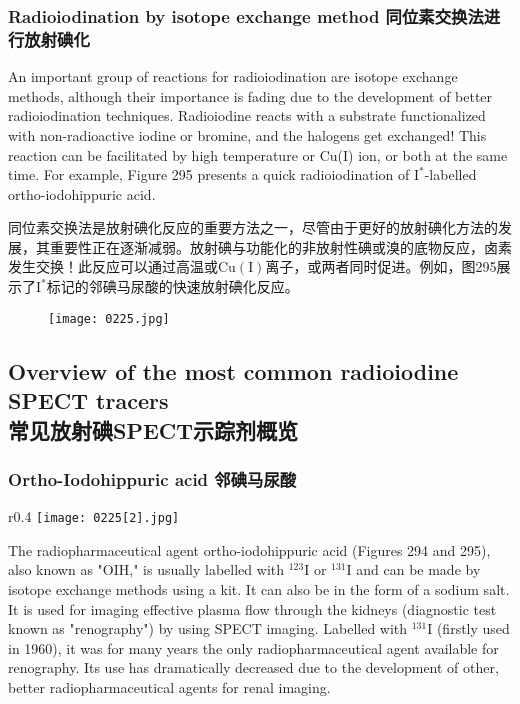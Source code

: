 \documentclass[dvipsnames, svgnames,a4paper,11pt]{article}
\begin{document}
\subsubsection{Radioiodination by isotope exchange method 同位素交换法进行放射碘化}  
An important group of reactions for radioiodination are isotope exchange methods, although their importance is fading due to the development of better radioiodination techniques. Radioiodine reacts with a substrate functionalized with non-radioactive iodine or bromine, and the halogens get exchanged! This reaction can be facilitated by high temperature or Cu(I) ion, or both at the same time. For example, Figure 295 presents a quick radioiodination of \(\mathrm{I}^*\)-labelled ortho-iodohippuric acid.  

同位素交换法是放射碘化反应的重要方法之一，尽管由于更好的放射碘化方法的发展，其重要性正在逐渐减弱。放射碘与功能化的非放射性碘或溴的底物反应，卤素发生交换！此反应可以通过高温或\(\mathrm{Cu(I)}\)离子，或两者同时促进。例如，图295展示了\(\mathrm{I}^*\)标记的邻碘马尿酸的快速放射碘化反应。  

\begin{figure}[h]
	\centering
    \texttt{[image: 0225.jpg]}  
     \label{fig294}
\end{figure}

\subsection{Overview of the most common radioiodine SPECT tracers\\ 常见放射碘SPECT示踪剂概览}  
\subsubsection{Ortho-Iodohippuric acid 邻碘马尿酸}  


\begin{wrapfigure}{r}{0.4\textwidth}
    \centering
    \texttt{[image: 0225[2].jpg]}
     \label{fig295}
\end{wrapfigure}

The radiopharmaceutical agent ortho-iodohippuric acid (Figures 294 and 295), also known as "OIH," is usually labelled with \(\mathrm{^{123}I}\) or \(\mathrm{^{131}I}\) and can be made by isotope exchange methods using a kit. It can also be in the form of a sodium salt. It is used for imaging effective plasma flow through the kidneys (diagnostic test known as "renography") by using SPECT imaging. Labelled with \(\mathrm{^{131}I}\) (firstly used in 1960), it was for many years the only radiopharmaceutical agent available for renography. Its use has dramatically decreased due to the development of other, better radiopharmaceutical agents for renal imaging.
\end{document}
